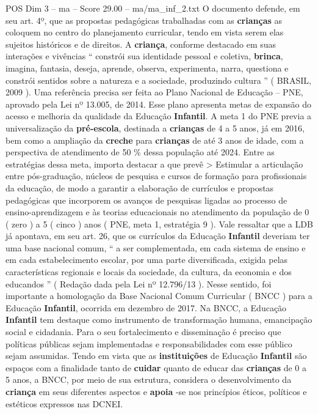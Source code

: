 \begin{textsample}{POS Dim 3 – ma – Score 29.00 – ma/ma\_inf\_2.txt}
O documento defende, em seu art. 4º, que as propostas pedagógicas trabalhadas com as \textbf{crianças} as coloquem no centro do planejamento curricular, tendo em vista serem elas sujeitos históricos e de direitos.
A \textbf{criança}, conforme destacado em suas interações e vivências “ constrói sua identidade pessoal e coletiva, \textbf{brinca}, imagina, fantasia, deseja, aprende, observa, experimenta, narra, questiona e constrói sentidos sobre a natureza e a sociedade, produzindo cultura ” ( BRASIL, 2009 ).
Uma referência precisa ser feita ao Plano Nacional de Educação – PNE, aprovado pela Lei nº 13.005, de 2014.
Esse plano apresenta metas de expansão do acesso e melhoria da qualidade da Educação \textbf{Infantil}.
A meta 1 do PNE previa a universalização da \textbf{pré-escola}, destinada a \textbf{crianças} de 4 a 5 anos, já em 2016, bem como a ampliação da \textbf{creche} para \textbf{crianças} de até 3 anos de idade, com a perspectiva de atendimento de 50 \% dessa população até 2024.
Entre as estratégias dessa meta, importa destacar a que prevê > Estimular a articulação entre pós-graduação, núcleos de pesquisa e cursos de formação para profissionais da educação, de modo a garantir a elaboração de currículos e propostas pedagógicas que incorporem os avanços de pesquisas ligadas ao processo de ensino-aprendizagem e às teorias educacionais no atendimento da população de 0 ( zero ) a 5 ( cinco ) anos ( PNE, meta 1, estratégia 9 ).
Vale ressaltar que a LDB já apontava, em seu art. 26, que os currículos da Educação \textbf{Infantil} deveriam ter uma base nacional comum, “ a ser complementada, em cada sistema de ensino e em cada estabelecimento escolar, por uma parte diversificada, exigida pelas características regionais e locais da sociedade, da cultura, da economia e dos educandos ” ( Redação dada pela Lei nº 12.796/13 ).
Nesse sentido, foi importante a homologação da Base Nacional Comum Curricular ( BNCC ) para a Educação \textbf{Infantil}, ocorrida em dezembro de 2017.
Na BNCC, a Educação \textbf{Infantil} tem destaque como instrumento de transformação humana, emancipação social e cidadania.
Para o seu fortalecimento e disseminação é preciso que políticas públicas sejam implementadas e responsabilidades com esse público sejam assumidas.
Tendo em vista que as \textbf{instituições} de Educação \textbf{Infantil} são espaços com a finalidade tanto de \textbf{cuidar} quanto de educar das \textbf{crianças} de 0 a 5 anos, a BNCC, por meio de sua estrutura, considera o desenvolvimento da \textbf{criança} em seus diferentes aspectos e \textbf{apoia} -se nos princípios éticos, políticos e estéticos expressos nas DCNEI.

\end{textsample}
